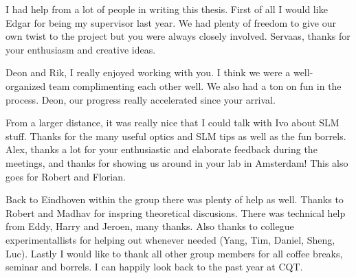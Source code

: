 \noindent I had help from a lot of people in writing this thesis.
First of all I would like Edgar for being my supervisor last year. 
We had plenty of freedom to give our own twist to the project but you were always closely involved.
Servaas, thanks for your enthusiasm and creative ideas.

Deon and Rik, I really enjoyed working with you.
I think we were a well-organized team complimenting each other well.
We also had a ton on fun in the process.
Deon, our progress really accelerated since your arrival. 

From a larger distance, it was really nice that I could talk with Ivo about SLM stuff.
Thanks for the many useful optics and SLM tips as well as the fun borrels.
Alex, thanks a lot for your enthusiastic and elaborate feedback during the meetings, and thanks for showing us around in your lab in Amsterdam!
This also goes for Robert and Florian. 

Back to Eindhoven within the group there was plenty of help as well.
Thanks to Robert and Madhav for inspring theoretical discusions.
There was technical help from Eddy, Harry and Jeroen, many thanks.
Also thanks to collegue experimentallists for helping out whenever needed (Yang, Tim, Daniel, Sheng, Luc).
Lastly I would like to thank all other group members for all coffee breaks, seminar and borrels. 
I can happily look back to the past year at CQT. 
